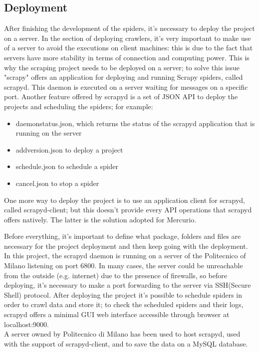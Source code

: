\subsection{Deployment}
After finishing the development of the spiders, it's necessary to deploy the project on a server. 
In the section of deploying crawlers, it's very important to make use of a server to avoid the executions on client machines: this is due to the fact that servers have more stability in terms of connection and computing power. 
This is why the scraping project needs to be deployed on a server; to solve this issue "scrapy" offers an application for deploying and running Scrapy spiders, called scrapyd\cite{scrapyd}. 
This daemon is executed on a server waiting for messages on a specific port. 
Another feature offered by scrapyd is a set of JSON API to deploy the projects and scheduling the spiders; for example:
\begin{itemize}
	\item daemonstatus.json, which returns the status of the scrapyd application that is running on the server
	\item addversion.json to deploy a project
	\item schedule.json to schedule a spider
	\item cancel.json to stop a spider
\end{itemize}
One more way to deploy the project is to use an application client for scrapyd, called scrapyd-client\cite{scrapydclient}; but this doesn't provide every API operations that scrapyd offers natively. The latter is the solution adopted for Mercurio.
\par
Before everything, it's important to define what package, folders and files are necessary for the project deployment and then keep going with the deployment. 
In this project, the scrapyd daemon is running on a server of the Politecnico of Milano listening on port 6800. 
In many cases, the server could be unreachable from the outside (e.g. internet) due to the presence of firewalls, so before deploying, it's necessary to make a port forwarding to the server via SSH(Secure Shell)\cite{ssh} protocol. 
After deploying the project it's possible to schedule spiders in order to crawl data and store it; to check the scheduled spiders and their logs, scrapyd offers a minimal GUI web interface accessible through browser at localhost:9000. \\
A server owned by Politecnico di Milano has been used to host scrapyd, used with the support of scrapyd-client, and to save the data on a MySQL database.